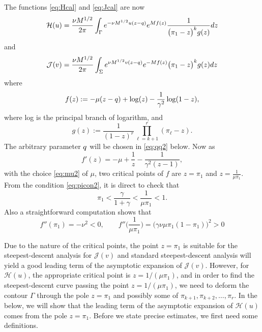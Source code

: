 \documentclass[11pt]{article}
\begin{document}
The functions \eqref{eq:Hcal} and \eqref{eq:Jcal} are now
\begin{equation}\label{eq:H2}
  \mathcal{H}(u)
  = \frac{\nu M^{1/2}}{2\pi}
  \int_\Gamma e^{-\nu M^{1/2} u(z-q)} e^{Mf(z)}
  \frac1{\bigl(\pi_1-z\bigr)^kg(z)} dz
\end{equation}
and
\begin{equation}\label{eq:J2}
  \mathcal{J}(v) = \frac{\nu M^{1/2}}{2\pi} \int_\Sigma
  e^{\nu M^{1/2} v(z-q)} e^{-Mf(z)}
  \bigl(\pi_1-z\bigr)^kg(z) dz
\end{equation}
where
\begin{equation}
   f(z) := -\mu (z-q) +\log(z) - \frac1{\gamma^2}\log(1-z),
\end{equation}
where log is the principal branch of logarithm, and
\begin{equation}
  g(z) := \frac{1}{(1-z)^{r}}
  \prod_{\ell=k+1}^r (\pi_\ell-z).
\end{equation}
The arbitrary parameter $q$ will be chosen in \eqref{eq:qq2}
below.
 Now as
\begin{equation}
  f'(z) = -\mu + \frac1{z} - \frac{1}{\gamma^2(z-1)},
\end{equation}
with the choice \eqref{eq:mu2} of $\mu$, two critical points of
$f$ are $z=\pi_1$ and $z=\frac1{\mu \pi_1}$. From the condition
\eqref{eq:picon2}, it is direct to check that
\begin{equation}
  \pi_1<\frac{\gamma}{1+\gamma}< \frac1{\mu\pi_1} <1.
\end{equation}
Also a straightforward computation shows that
\begin{equation}
  f''(\pi_1)= -\nu^2<0, \qquad f''\bigl(\frac1{\mu \pi_1}\bigr)
= \bigl( \gamma\nu \mu \pi_1(1-\pi_1) \bigr)^2 >0
\end{equation}

Due to the nature of the critical points, the point $z=\pi_1$ is
suitable for the steepest-descent analysis for $\mathcal{J}(v)$
and standard steepest-descent analysis will yield a good leading
term of the asymptotic expansion of $\mathcal{J}(v)$. However, for
$\mathcal{H}(u)$, the appropriate critical point is $z=1/(\mu
\pi_1)$, and in order to find the steepest-descent curve passing
the point $z=1/(\mu \pi_1)$, we need to deform the contour
$\Gamma$ through the pole $z=\pi_1$ and possibly some of
$\pi_{k+1}, \pi_{k+2}, \dots, \pi_{r}$. In the below, we will show
that the leading term of the asymptotic expansion of
$\mathcal{H}(u)$ comes from the pole $z=\pi_1$. Before we state
precise estimates, we first need some definitions.
\end{document}
